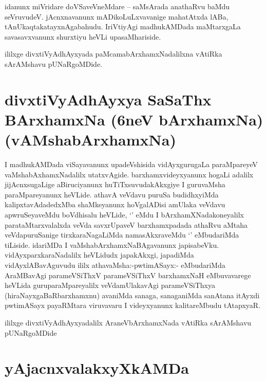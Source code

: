 \begin{artha}
idanunx miVridare doVSaveVneMdare -- saMsArada anathaRvu baMdu seVruvudeV. jAcnxnavanunx 
mADikoLuLxvavanige mahatAtxda lABa, tAnUkaqtakatayxnAgabahudu. IriVtiyAgi madhukAMDada 
maMtarxgaLa savasavxvanunx shurxtiyu heVLi upasaMhariside.
\end{artha}

\begin{center}
ililxge divxtiVyAdhAyxyada paMcamabArxhamxNadalilxna vAtiRka sArAMshavu pUNaRgoMDide.
\end{center}

\section*{divxtiVyAdhAyxya SaSaThx BArxhamxNa (6neV bArxhamxNa) (vAMshabArxhamxNa)}

\begin{center}


\end{center}

\begin{artha}
I madhukAMDada viSayavanunx upadeVshisida vidAyxgurugaLa paraMpareyeV vaMshabAxhamxNadalilx utatxvAgide. barxhamxvideyxyanunx hogaLi adalilx jijAcnxsugaLige aBiruciyanunx huTiTxsuvudakAkxgiye I guruvaMsha paraMpareyanunx heVLide. athavA veVdavu puruSa budidhxyiMda kalipxtavAdadedxMba shaMkeyanunx hoVgalADisi amUlaka veVdavu apwruSeyaveMdu boVdhisalu heVLide, `\stext'  eMdu I bArxhamXNadakoneyalilx parataMtarxvalalxda veVda savxrUpaveV barxhamxpadada athaRvu aMtaha veVdapuruSanige tirxkaraNagaLiMda namasAkxraveMdu `\stext' eMbudariMda tiLiside. idariMDa I vaMshabArxhamxNaBAgavanunx japisabeVku. vidAyxparxkaraNadalilx heVLidudx japakAkxgi, japadiMda vidAyxlABavAguvudu ililx athavaMsha:-pwtimASayx:- eMbudariMda AraMBavAgi parameVSiThxV parameVSiThxV barxhamxNaH eMbuvavarege heVLida guruparaMpareyalilx veVdamUlakavAgi parameVSiThxya (hiraNayxgaBaRbarxhamxnu) avaniMda sanaga, sanaganiMda sanAtana itAyxdi pwtimASayx payaRMtara viruvavaru I videyxyanunx kalitareMbudu tAtapxyaR.
\end{artha}

\begin{center}
ililxge divxtiVyAdhAyxyadalilx AraneVbArxhamxNada vAtiRka sArAMshavu  pUNaRgoMDide
\end{center}

\section*{yAjacnxvalakxyXkAMDa}


